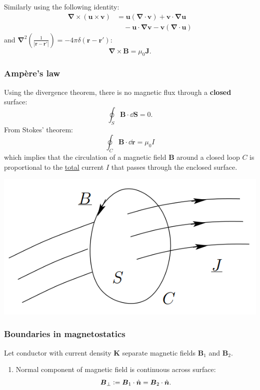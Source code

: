 \documentclass{article}
\newcommand{\deq}{\vcentcolon=}
\newcommand{\vc}[1]{\boldsymbol{#1}}
\begin{document}
\begin{multicols*}{3}
Similarly using the following identity:
\begin{align*}
    \vc{\nabla}\times(\vc{u}\times\vc{v})
    &=\vc{u}(\vc{\nabla}\cdot\vc{v})
    +\vc{v}\cdot\vc{\nabla}\vc{u} \\
    &\quad-\vc{u}\cdot\vc{\nabla}\vc{v}
    -\vc{v}(\vc{\nabla}\cdot\vc{u})
\end{align*}
and $\displaystyle\vc{\nabla}^2\left(
\frac{1}{|\vc{r}-\vc{r}'|}\right)
=-4\pi\delta(\vc{\vc{r}-\vc{r}'})$:
$$\vc{\nabla}\times\vc{B}=\mu_0\vc{J}.$$

\subsubsection*{Amp\`ere's law}
Using the divergence theorem, there is 
no magnetic flux through a \textbf{closed} surface:
$$\oint_S\vc{B}\cdot\dd\vc{S}=0.$$
From Stokes' theorem:
$$\oint_C\vc{B}\cdot\dd\vc{r}=\mu_0 I$$
which implies that the circulation of a magnetic field $\vc{B}$
around a closed loop $C$ is proportional to
the \underline{total} current $I$ that passes through
the enclosed surface.

\newcolumn

\begin{center}
    \includegraphics[scale=0.4]{f8.png}
\end{center}

\subsubsection*{Boundaries in magnetostatics}
Let conductor with current density $\vc{K}$
separate magnetic fields $\vc{B}_1$ and $\vc{B}_2$.
\begin{enumerate}
    \item Normal component of magnetic field
    is continuous across surface:
    $$\vc{B}_{\perp}\deq
    \vc{B}_1\cdot\hat{\vc{n}}=\vc{B}_2\cdot\hat{\vc{n}}.$$


\end{enumerate}
\end{multicols*}
\end{document}
